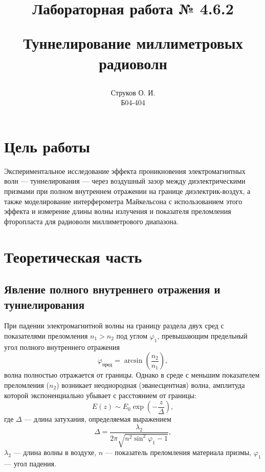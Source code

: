 \documentclass[12pt,a4paper]{article}
\begin{document}
\title{\begin{center}Лабораторная работа № 4.6.2\end{center}
Туннелирование миллиметровых радиоволн}
\author{Струков О. И. \\ Б04-404}
\date{}

\thispagestyle{empty}
\maketitle
\newpage
{}

\section*{Цель работы}
Экспериментальное исследование эффекта проникновения электромагнитных волн --- туннелирования --- через воздушный зазор между диэлектрическими призмами при полном внутреннем отражении на границе диэлектрик-воздух, а также моделирование интерферометра Майкельсона с использованием этого эффекта и измерение длины волны излучения и показателя преломления фторопласта для радиоволн миллиметрового диапазона.

\section*{Теоретическая часть}

\subsection*{Явление полного внутреннего отражения и туннелирования}
При падении электромагнитной волны на границу раздела двух сред с показателями преломления $n_1 > n_2$ под углом $\varphi_1$, превышающим предельный угол полного внутреннего отражения
\begin{equation}
\varphi_{\text{пред}} = \arcsin\left(\frac{n_2}{n_1}\right),
\end{equation}
волна полностью отражается от границы. Однако в среде с меньшим показателем преломления ($n_2$) возникает неоднородная (эванесцентная) волна, амплитуда которой экспоненциально убывает с расстоянием от границы:
\begin{equation}
E(z) \sim E_0 \exp\left(-\frac{z}{\Delta}\right),
\end{equation}
где $\Delta$ --- длина затухания, определяемая выражением
\begin{equation}
\Delta = \frac{\lambda_2}{2\pi\sqrt{n^2\sin^2\varphi_1 - 1}},
\label{eq:delta}
\end{equation}
$\lambda_2$ --- длина волны в воздухе, $n$ --- показатель преломления материала призмы, $\varphi_1$ --- угол падения.
\end{document}
